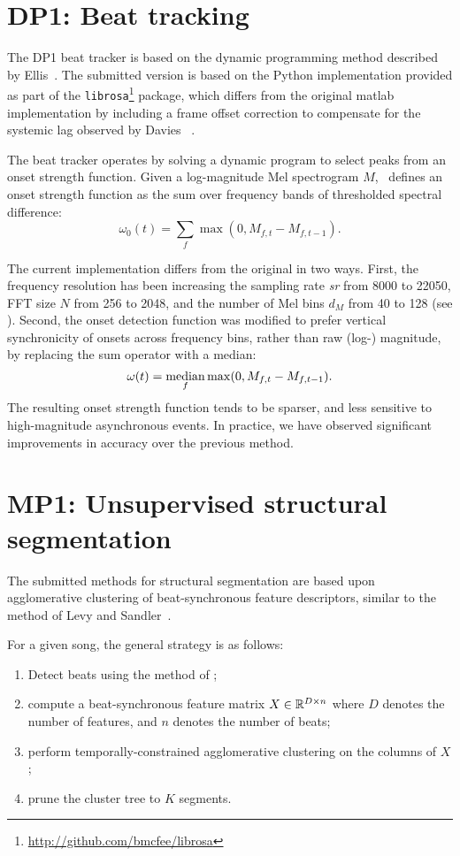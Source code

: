 \documentclass{article}
\begin{document}
\section{DP1: Beat tracking}

The DP1 beat tracker is based on the dynamic programming method described by Ellis~\cite{ellis2007beat}.
The submitted version is based on the Python implementation provided as part of the {\tt librosa}\footnote{\url{http://github.com/bmcfee/librosa}} package, 
which differs from the original matlab implementation by including a frame offset
correction to compensate for the systemic lag observed by Davies \etal~\cite{davies2009evaluation}.

The beat tracker operates by solving a dynamic program to select peaks from an onset strength function.  
Given a log-magnitude Mel spectrogram $M$,~\cite{ellis2007beat} defines an onset strength function as the sum over
frequency bands of thresholded spectral difference:
\[
\omega_0(t) = \sum_f \max(0, M_{f, t} - M_{f, t-1}).
\]

The current implementation differs from the original in two ways.  First, the frequency resolution has been
increasing the sampling rate {\em sr} from 8000 to 22050, FFT size $N$ from 256 to 2048, and the number of Mel bins
$d_M$ from 40 to 128 (see ).  Second, the onset detection function was modified to prefer
vertical synchronicity of onsets across frequency bins, rather than raw (log-) magnitude, by replacing the sum operator
with a median:
\[
\omega(t) = \operatorname*{median}_f \max(0, M_{f,t} - M_{f, t-1}).
\]
The resulting onset strength function tends to be sparser, and less sensitive to high-magnitude asynchronous
events.  In practice, we have observed significant improvements in accuracy over the previous method.

\label{sec:beats}

\section{MP1: Unsupervised structural segmentation}

The submitted methods for structural segmentation are based upon agglomerative clustering of beat-synchronous
feature descriptors, similar to the method of Levy and Sandler~\cite{levy2008structural}.

For a given song, the general strategy is as follows:
\begin{enumerate}
\item Detect beats using the method of ;
\item compute a beat-synchronous feature matrix $X \in \mathbb{R}^{D\times n}$ where $D$ denotes the number of features,
and $n$ denotes the number of beats;
\item perform temporally-constrained agglomerative clustering on the columns of $X$;
\item prune the cluster tree to $K$ segments.
\end{enumerate}
\end{document}
